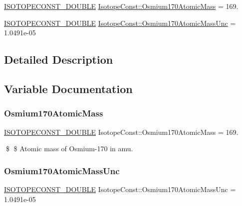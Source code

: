 \begin{DoxyCompactItemize}
\item 
\mbox{\hyperlink{group___isotope_const-_macros_ga8f45a7272ce02c0b4c65c44636ed719a}{I\+S\+O\+T\+O\+P\+E\+C\+O\+N\+S\+T\+\_\+\+D\+O\+U\+B\+LE}} \mbox{\hyperlink{group___isotope_const-_osmium-_os170_gaf4273cd2404e73c3ff8cf32156498d45}{Isotope\+Const\+::\+Osmium170\+Atomic\+Mass}} = 169.
\item 
\mbox{\hyperlink{group___isotope_const-_macros_ga8f45a7272ce02c0b4c65c44636ed719a}{I\+S\+O\+T\+O\+P\+E\+C\+O\+N\+S\+T\+\_\+\+D\+O\+U\+B\+LE}} \mbox{\hyperlink{group___isotope_const-_osmium-_os170_ga81adc52a1f19fc7f559a722b01b1a40d}{Isotope\+Const\+::\+Osmium170\+Atomic\+Mass\+Unc}} = 1.\+0491e-\/05
\end{DoxyCompactItemize}


\subsection{Detailed Description}


\subsection{Variable Documentation}
\mbox{\label{group___isotope_const-_osmium-_os170_gaf4273cd2404e73c3ff8cf32156498d45}} 
\subsubsection{\texorpdfstring{Osmium170\+Atomic\+Mass}{Osmium170AtomicMass}}
{\footnotesize\ttfamily \mbox{\hyperlink{group___isotope_const-_macros_ga8f45a7272ce02c0b4c65c44636ed719a}{I\+S\+O\+T\+O\+P\+E\+C\+O\+N\+S\+T\+\_\+\+D\+O\+U\+B\+LE}} Isotope\+Const\+::\+Osmium170\+Atomic\+Mass = 169.}

\$ \$ Atomic mass of Osmium-\/170 in amu. \mbox{\label{group___isotope_const-_osmium-_os170_ga81adc52a1f19fc7f559a722b01b1a40d}} 
\subsubsection{\texorpdfstring{Osmium170\+Atomic\+Mass\+Unc}{Osmium170AtomicMassUnc}}
{\footnotesize\ttfamily \mbox{\hyperlink{group___isotope_const-_macros_ga8f45a7272ce02c0b4c65c44636ed719a}{I\+S\+O\+T\+O\+P\+E\+C\+O\+N\+S\+T\+\_\+\+D\+O\+U\+B\+LE}} Isotope\+Const\+::\+Osmium170\+Atomic\+Mass\+Unc = 1.\+0491e-\/05}


